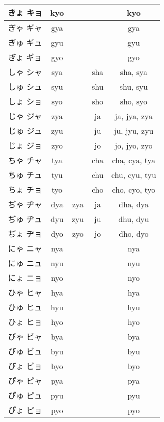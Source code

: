\documentclass{article}
\begin{document}
\begin{center}
\begin{japanese}
\begin{longtable}{|c|c c c|c|}
                きょ キョ & kyo &&& kyo \\ \hline
                ぎゃ ギャ & gya &&& gya \\ \hline
                ぎゅ ギュ & gyu &&& gyu \\ \hline
                ぎょ ギョ & gyo &&& gyo \\ \hline
                しゃ シャ & sya && sha & sha, sya \\ \hline
                しゅ シュ & syu && shu & shu, syu \\ \hline
                しょ ショ & syo && sho & sho, syo \\ \hline
                じゃ ジャ & zya && ja & ja, jya, zya \\ \hline
                じゅ ジュ & zyu && ju & ju, jyu, zyu \\ \hline
                じょ ジョ & zyo && jo & jo, jyo, zyo \\ \hline
                ちゃ チャ & tya && cha & cha, cya, tya \\ \hline
                ちゅ チュ & tyu && chu & chu, cyu, tyu \\ \hline
                ちょ チョ & tyo && cho & cho, cyo, tyo \\ \hline
                ぢゃ ヂャ & dya & zya & ja & dha, dya \\ \hline
                ぢゅ ヂュ & dyu & zyu & ju & dhu, dyu \\ \hline
                ぢょ ヂョ & dyo & zyo & jo & dho, dyo \\ \hline
                にゃ ニャ & nya &&& nya \\ \hline
                にゅ ニュ & nyu &&& nyu \\ \hline
                にょ ニョ & nyo &&& nyo \\ \hline
                ひゃ ヒャ & hya &&& hya \\ \hline
                ひゅ ヒュ & hyu &&& hyu \\ \hline
                ひょ ヒョ & hyo &&& hyo \\ \hline
                びゃ ビャ & bya &&& bya \\ \hline
                びゅ ビュ & byu &&& byu \\ \hline
                びょ ビョ & byo &&& byo \\ \hline
                ぴゃ ピャ & pya &&& pya \\ \hline
                ぴゅ ピュ & pyu &&& pyu \\ \hline
                ぴょ ピョ & pyo &&& pyo \\ \hline

\end{longtable}
\end{japanese}
\end{center}
\end{document}
